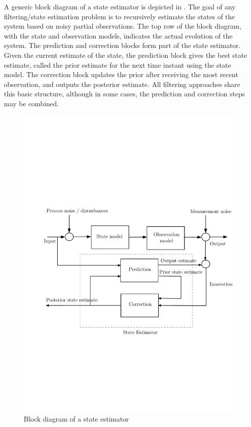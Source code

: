 A generic block diagram of a state estimator is depicted in . The goal of any filtering/state estimation problem is to recursively estimate the states of the system based on noisy partial observations. The top row of the block diagram, with the state and observation models, indicates the actual evolution of the system. The prediction and correction blocks form part of the state estimator. Given the current estimate of the state, the prediction block gives the best state estimate, called the prior estimate for the next time instant using the state model. The correction block updates the prior after receiving the most recent observation, and outputs the posterior estimate. All filtering approaches share this basic structure, although in some cases, the prediction and correction steps may be combined.  

\begin{figure}
	\includegraphics[width=6in]{images/Chap1_state_est_block}
	\caption{Block diagram of a state estimator}
	\label{Fig:state_estimator}
\end{figure} 

